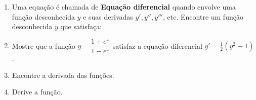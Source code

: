 \begin{enumerate}
     \item Uma equação é chamada de \textbf{Equação diferencial} quando envolve uma função desconhecida $y$ e suas derivadas $y', y'', y'''$,  etc. Encontre um função desconhecida $y$ que satisfaça:
         \begin{enumerate}
            \end{enumerate}
    \item Mostre que a função $y=\dfrac{1+e^x}{1-e^x}$ satisfaz a equação diferencial $y'=\frac{1}{2}(y^2-1)$.
   
    \item Encontre a derivada das funções.
        \begin{enumerate}
        \end{enumerate}
        
    \item Derive a função.
        \begin{enumerate}
        \end{enumerate}
        

\end{enumerate}
